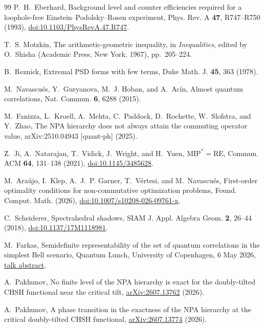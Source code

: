 \begin{thebibliography}{99}
P.~H.~Eberhard,
Background level and counter efficiencies required for a loophole-free Einstein--Podolsky--Rosen experiment,
Phys. Rev. A \textbf{47}, R747--R750 (1993),
\href{https://doi.org/10.1103/PhysRevA.47.R747}{doi:10.1103/PhysRevA.47.R747}.

T.~S. Motzkin,
The arithmetic-geometric inequality, in
\emph{Inequalities}, edited by O.~Shisha
(Academic Press, New York, 1967), pp.~205--224.

B.~Reznick,
Extremal PSD forms with few terms,
Duke Math. J. \textbf{45}, 363 (1978).

M.~Navascu\'es, Y.~Guryanova, M.~J. Hoban, and A.~Ac\'in,
Almost quantum correlations,
Nat. Commun. \textbf{6}, 6288 (2015).

M.~Fanizza, L.~Kroell, A.~Mehta, C.~Paddock, D.~Rochette, W.~Slofstra, and Y.~Zhao,
The NPA hierarchy does not always attain the commuting operator value,
arXiv:2510.04943 [quant-ph] (2025).

Z.~Ji, A.~Natarajan, T.~Vidick, J.~Wright, and H.~Yuen,
$\mathrm{MIP}^*=\mathrm{RE}$,
Commun. ACM \textbf{64}, 131--138 (2021),
\href{https://doi.org/10.1145/3485628}{doi:10.1145/3485628}.

M.~Ara\'ujo, I.~Klep, A.~J.~P. Garner, T.~V\'ertesi, and M.~Navascu\'es,
First-order optimality conditions for non-commutative optimization problems,
Found. Comput. Math. (2026),
\href{https://doi.org/10.1007/s10208-026-09761-x}{doi:10.1007/s10208-026-09761-x}.

C.~Scheiderer,
Spectrahedral shadows,
SIAM J. Appl. Algebra Geom. \textbf{2}, 26--44 (2018),
\href{https://doi.org/10.1137/17M1118981}{doi:10.1137/17M1118981}.

M.~Farkas,
Semidefinite representability of the set of quantum correlations in the simplest Bell scenario,
Quantum Lunch, University of Copenhagen, 6 May 2026,
\href{https://qmath.ku.dk/events/quantum-lunch/quantum-lunch-2026/qlunch-mate-farkas/}{talk abstract}.

A.~Pakhunov, No finite level of the NPA hierarchy is exact for the doubly-tilted CHSH functional near the critical tilt, \href{https://arxiv.org/abs/2607.13762}{arXiv:2607.13762} (2026).

A.~Pakhunov, A phase transition in the exactness of the NPA hierarchy at the critical doubly-tilted CHSH functional, \href{https://arxiv.org/abs/2607.13774}{arXiv:2607.13774} (2026).


\end{thebibliography}
